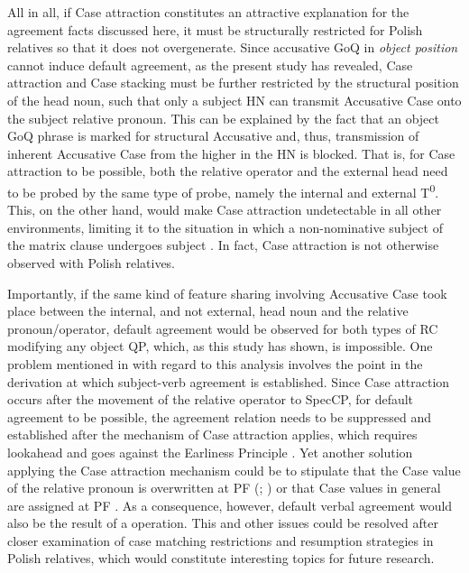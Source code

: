 \documentclass[output=paper]{langsci/langscibook}
\begin{document}
All in all, if Case attraction constitutes an attractive explanation for the agreement facts discussed here, it must be structurally restricted for Polish relatives so that it does not overgenerate. Since accusative GoQ in \textit{object position} cannot induce default agreement, as the present study has revealed, Case attraction and Case stacking must be further restricted by the structural position of the head noun, such that only a subject HN can transmit Accusative Case onto the subject relative pronoun. This can be explained by the fact that an object GoQ phrase is marked for structural Accusative and, thus, transmission of inherent Accusative Case from the higher  in the HN is blocked. That is, for Case attraction to be possible, both the relative operator and the external head need to be probed by the same type of probe, namely the internal and external T\textsuperscript{0}. This, on the other hand, would make Case attraction undetectable in all other environments, limiting it to the situation in which a non-nominative subject of the matrix clause undergoes subject . In fact, Case attraction is not otherwise observed with Polish relatives. 

Importantly, if the same kind of feature sharing involving Accusative Case took place between the internal, and not external, head noun and the relative pronoun\slash operator, default agreement would be observed for both types of RC modifying any object QP, which, as this study has shown, is impossible. One problem mentioned in \citet{Łęska2016} with regard to this analysis involves the point in the derivation at which subject-verb agreement is established. Since Case attraction occurs after the movement of the relative operator to SpecCP, for default agreement to be possible, the agreement relation needs to be suppressed and established after the mechanism of Case attraction applies, which requires lookahead and goes against the Earliness Principle \citep{Pesetsky1989}. Yet another solution applying the Case attraction mechanism could be to stipulate that the Case value of the relative pronoun is overwritten at PF (\citealt[68–69]{Bianchi2000}; \citealt{Spyropoulos2011}) or that Case values in general are assigned at PF \citep{Alexiadou2007Syntactic,Assmann2014Matching}. As a consequence, however, default verbal agreement would also be the result of a  operation. This and other issues could be resolved after closer examination of case matching restrictions and resumption strategies in Polish relatives, which would constitute interesting topics for future research.
\end{document}
